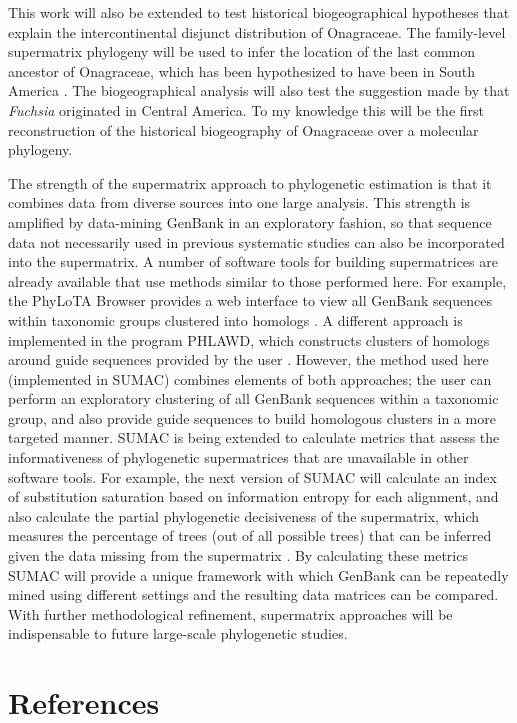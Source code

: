 \documentclass[review]{elsarticle}
\begin{document}
This work will also be extended to test historical 
biogeographical hypotheses that explain the intercontinental disjunct distribution of Onagraceae.
The family-level supermatrix phylogeny will be used to infer the location of the 
last common ancestor of Onagraceae, which has been hypothesized
to have been in South America \citep{raven1974angiosperm, raven1988onagraceae}.
The biogeographical analysis will also test the suggestion made by \citet{Berry2004} that \textit{Fuchsia}
originated in Central America. 
To my knowledge this will be the first reconstruction of 
the historical biogeography of Onagraceae over a molecular phylogeny.

The strength of the supermatrix approach to phylogenetic estimation
is that it combines data from diverse sources into one large analysis.
This strength is amplified by data-mining GenBank in an exploratory
fashion, so that sequence data not necessarily used in previous systematic
studies can also be incorporated into the supermatrix.
A number of software tools for building supermatrices are already available 
that use methods similar to those performed here.
For example, the PhyLoTA Browser 
provides a web interface to view all GenBank sequences within
taxonomic groups clustered into homologs \citep{Sanderson2008}.
A different approach is implemented in the program PHLAWD,
which constructs clusters of homologs around
guide sequences provided by the user \citep{Smith2009}.
However, the method used here (implemented in SUMAC) combines elements of both approaches;
the user can perform an exploratory clustering of all GenBank sequences
within a taxonomic group, and also provide guide sequences to build
homologous clusters in a more targeted manner. 
SUMAC is being extended to calculate metrics that assess
the informativeness of phylogenetic supermatrices 
that are unavailable in other software tools.
For example, the next version of SUMAC will calculate
an index of substitution saturation based on information entropy \citep{Xia2003}
for each alignment,
and also calculate the partial phylogenetic decisiveness 
of the supermatrix,
which measures the percentage of trees (out of all possible trees)
that can be inferred given the data missing from the supermatrix \citep{Sanderson2010, Fischer2012}.
By calculating these metrics SUMAC will provide a unique
framework with which GenBank can be repeatedly mined 
using different settings
and the resulting data matrices can be compared.
With further methodological refinement, 
supermatrix approaches will be indispensable
to future large-scale phylogenetic studies.




\section*{References}


\end{document}
